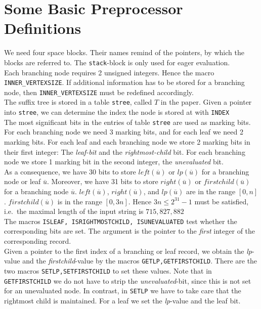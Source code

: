 \documentclass[a4paper]{article}
\begin{document}
\section{Some Basic Preprocessor Definitions}

We need four space blocks. Their names remind of the pointers, by which
the blocks are referred to. The \texttt{stack}-block is only used for
eager evaluation.\\

Each branching node requires 2 unsigned integers. Hence the macro
\texttt{INNER_VERTEXSIZE}. If additional information has to be stored for a
branching node, then \texttt{INNER_VERTEXSIZE} must be redefined accordingly.\\

The suffix tree is stored in a table \texttt{stree}, called \(T\) in the
paper. Given a pointer into \texttt{stree}, we can determine the index the
node is stored at with \texttt{INDEX}\\

The most significant bits in the entries of table \texttt{stree} are used as
marking bits. For each branching node we need 3 marking bits, and for each leaf
we need 2 marking bits. For each leaf and each branching node we store 2
marking bits in their first integer: The \emph{leaf-bit} and the
\emph{rightmost-child} bit. For each branching node we store 1 marking bit in
the second integer, the \emph{unevaluated} bit.\\

As a consequence, we have 30 bits to store \(\mathit{left}(\overline{u})\) or
\(\mathit{lp}(\overline{u})\) for a branching node or leaf \(\overline{u}\).
Moreover, we have 31 bits to store \(\mathit{right}(\overline{u})\) or
\(\mathit{firstchild}(\overline{u})\) for a branching node \(\overline{u}\).
\(\mathit{left}(\overline{u})\), \(\mathit{right}(\overline{u})\), and
\(\mathit{lp}(\overline{u})\) are in the range \([0,n]\).
\(\mathit{firstchild}(\overline{u})\) is in the range \([0,3n]\). Hence
\(3n\leq 2^{31}-1\) must be satisfied, i.e.\ the maximal length of the input
string is \(715{,}827{,}882\)\\

The macros \texttt{ISLEAF, ISRIGHTMOSTCHILD, ISUNEVALUATED} test whether the
corresponding bits are set. The argument is the pointer to the \emph{first}
integer of the corresponding record.\\

Given a pointer to the first index of a branching or leaf record, we obtain the
\emph{lp}-value and the \emph{firstchild}-value by the macros
\texttt{GETLP,GETFIRSTCHILD}. There are the two macros
\texttt{SETLP,SETFIRSTCHILD} to set these values. Note that in
\texttt{GETFIRSTCHILD} we do not have to strip the \emph{unevaluated}-bit,
since this is not set for an unevaluated node. In contrast, in \texttt{SETLP}
we have to take care that the rightmost child is maintained. For a leaf we set
the \emph{lp}-value and the leaf bit.\\
\end{document}
